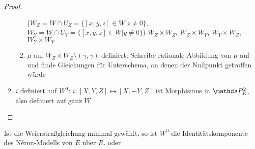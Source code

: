 \documentclass[german]{scrreprt}
\begin{document}
\begin{Lemma}
\begin{proof}
\begin{enumerate}
\begin{enumerate}
        ($W_Z=W\cap U_Z=\{[x,y,z]\in W| z\neq0\}$,
        $W_Y=W\cap U_Y=\{[x,y,z]\in W| y\neq0\}$)
        $W_Z\times W_Z$, $W_Z\times W_Y$, $W_Y\times W_Z$,
        $W_Y\times W_Y$
      \item $\mu$ auf $W_Z\times W_Z\setminus(\gamma,\gamma)$
        definiert:
        Schreibe rationale Abbildung von $\mu$ auf und finde
        Gleichungen für Unterschema, an denen der Nullpunkt getroffen
        würde
      \end{enumerate}
    \item $i$ definiert auf $W^0$:
      $i\colon [X,Y,Z]\mapsto [X,-Y,Z]$ ist Morphismus in $\P_R^2$,
      also definiert auf ganz $W$
    \end{enumerate}
  \end{proof}
\end{Lemma}
\begin{Bemerkung}
    Ist die Weierstraßgleichung minimal gewählt,
  so ist $W^0$ die Identitätskomponente des Néron-Modells von
  $E$ über $R$.
  \cite[Corollary IV.9.1]{silverman2} oder
  \cite[Chapter 1.5, S.\,23]{neron}
\end{Bemerkung}
\end{document}
